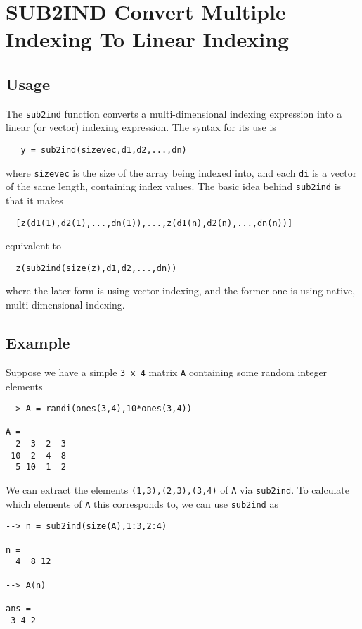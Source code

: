 \section{SUB2IND Convert Multiple Indexing To Linear Indexing}

\subsection{Usage}

The \verb|sub2ind| function converts a multi-dimensional indexing expression
into a linear (or vector) indexing expression.  The syntax for its use
is
\begin{verbatim}
   y = sub2ind(sizevec,d1,d2,...,dn)
\end{verbatim}
where \verb|sizevec| is the size of the array being indexed into, and each
\verb|di| is a vector of the same length, containing index values.  The basic
idea behind \verb|sub2ind| is that it makes
\begin{verbatim}
  [z(d1(1),d2(1),...,dn(1)),...,z(d1(n),d2(n),...,dn(n))]
\end{verbatim}
equivalent to
\begin{verbatim}
  z(sub2ind(size(z),d1,d2,...,dn))
\end{verbatim}
where the later form is using vector indexing, and the former one is using
native, multi-dimensional indexing.
\subsection{Example}

Suppose we have a simple \verb|3 x 4| matrix \verb|A| containing some random integer
elements
\begin{verbatim}
--> A = randi(ones(3,4),10*ones(3,4))

A = 
  2  3  2  3 
 10  2  4  8 
  5 10  1  2 
\end{verbatim}
We can extract the elements \verb|(1,3),(2,3),(3,4)| of \verb|A| via \verb|sub2ind|.
To calculate which elements of \verb|A| this corresponds to, we can use
\verb|sub2ind| as
\begin{verbatim}
--> n = sub2ind(size(A),1:3,2:4)

n = 
  4  8 12 

--> A(n)

ans = 
 3 4 2 
\end{verbatim}
